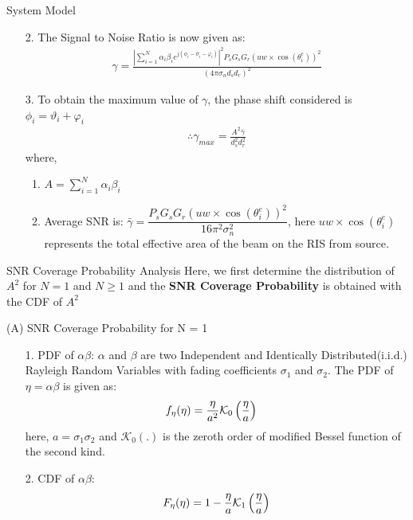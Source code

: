 \documentclass{beamer}
\begin{document}
\begin{frame}{System Model}
    \begin{block}{}
        \begin{enumerate}
            \item [2.]The Signal to Noise Ratio is now given as:
                \begin{align}
                    \gamma = \frac{\left|\sum_{i=1}^{N} \alpha_i \beta_i e^{j(\phi_i - \vartheta_i - \varphi_i)}\right|^2 P_s G_s G_r (uw\times \cos{(\theta_i^e)})^2}{(4\pi \sigma_n d_s d_r)^2}
                \end{align}
                \item [3.] To obtain the maximum value of $\gamma$, the phase shift considered is $\phi_i = \vartheta_i + \varphi_i$
                \begin{align}
                    \therefore \gamma_{max} = \frac{A^2 \bar\gamma}{d_s^2 d_r^2}
                \end{align}
                where, 
                \begin{enumerate}
                    \item $A = \sum_{i=1}^{N} \alpha_i \beta_i$
                    \item Average SNR is: $\bar\gamma = \dfrac{P_s G_s G_r (u w\times \cos{(\theta_i^e)})^2}{16 \pi^2 \sigma^2_n}$,
                    here $u w \times\cos(\theta^e_i)$ represents the total effective area of the beam on the RIS from source. 
                \end{enumerate}
        \end{enumerate}
    \end{block}
\end{frame}
\begin{frame}{SNR Coverage Probability Analysis}
    Here, we first determine the distribution of $A^2$ for $N=1$ and $N\geq 1$ and the \textbf{SNR Coverage Probability} is obtained with the CDF of $A^2$
    \begin{block}{(A) SNR Coverage Probability for N = 1}
        \begin{enumerate}
            \item[1.] PDF of $\alpha\beta$:
            $\alpha$ and $\beta$ are two Independent and Identically Distributed(i.i.d.) Rayleigh Random Variables with fading coefficients \(\sigma_1\) and \(\sigma_2\). The PDF of \(\eta = \alpha\beta\) is given as:
            \begin{align}
                \mathnormal{f}_{\eta}(\eta) &= \frac{\eta}{a^2}\mathcal{K}_0\left(\frac{\eta}{a}\right)
            \end{align}
            here, $a = \sigma_1\sigma_2$ and $\mathcal{K}_0(.)$ is the zeroth order of modified Bessel function of the second kind.
            \item[2.] CDF of $\alpha\beta$: 
            \begin{align}
                \mathnormal{F}_{\eta}(\eta) = 1 - \frac{\eta}{a}\mathcal{K}_1\left(\frac{\eta}{a}\right)
            \end{align}
        \end{enumerate}
    \end{block}
\end{frame}
\end{document}
